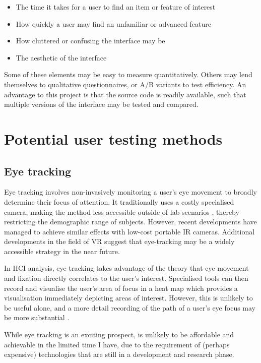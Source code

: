 \documentclass{scrartcl}
\begin{document}
\begin{itemize}
	\item The time it takes for a user to find an item or feature of interest
	\item How quickly a user may find an unfamiliar or advanced feature
	\item How cluttered or confusing the interface may be
	\item The aesthetic of the interface
\end{itemize}

Some of these elements may be easy to measure quantitatively. Others may lend themselves to qualitative questionnaires, or A/B variants to test efficiency. An advantage to this project is that the source code is readily available, such that multiple versions of the interface may be tested and compared.

\section{Potential user testing methods}
\subsection{Eye tracking}
Eye tracking involves non-invasively monitoring a user's eye movement to broadly determine their focus of attention. \cite{pool_eye_2006} It traditionally uses a costly specialised camera, making the method less accessible outside of lab scenarios \cite{devicecomparison}, thereby restricting the demographic range of subjects. However, recent developments \cite{lowcosttracker} \cite{ho_low_2014} have managed to achieve similar effects with low-cost portable IR cameras. Additional developments in the field of VR suggest that eye-tracking may be a widely accessible strategy in the near future.

In HCI analysis, eye tracking takes advantage of the theory that eye movement and fixation directly correlates to the user's interest. \cite{pool_eye_2006} Specialised tools can then record and visualise the user's area of focus in a heat map which provides a visualisation immediately depicting areas of interest. However, this is unlikely to be useful alone, and a more detail recording of the path of a user's eye focus may be more substantial \cite{gazepatterns}.

While eye tracking is an exciting prospect, is unlikely to be affordable and achievable in the limited time I have, due to the requirement of (perhaps expensive) technologies that are still in a development and research phase.
\end{document}
